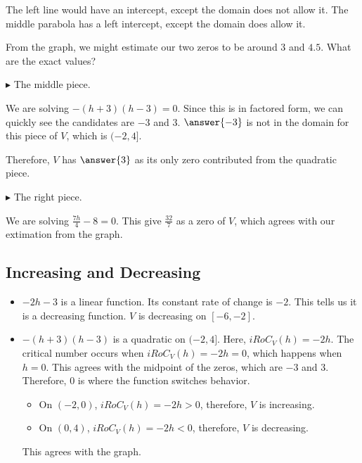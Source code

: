 \documentclass{ximera}
\begin{document}
The left line would have an intercept, except the domain does not allow it.  The middle parabola has a left intercept, except the domain does allow it. 

From the graph, we might estimate our two zeros to be around $3$ and $4.5$.  What are the exact values?







$\blacktriangleright$ The middle piece. 


\begin{explanation}


We are solving $-(h+3)(h-3) = 0$.  Since this is in factored form, we can quickly see the candidates are $-3$ and $3$.  $\answer{-3}$ is not in the domain for this piece of $V$, which is $(-2, 4]$.

Therefore, $V$ has $\answer{3}$ as its only zero contributed from the quadratic piece.
\end{explanation}



$\blacktriangleright$ The right piece. 


\begin{explanation}


We are solving $\frac{7h}{4} - 8 = 0$.  This give $\frac{32}{7}$ as a zero of $V$, which agrees with our extimation from the graph.

\end{explanation}







\subsection{Increasing and Decreasing} 



\begin{itemize}
\item \textbf{$-2h-3$} is a linear function.  Its constant rate of change is $-2$.  This tells us it is a decreasing function.  $V$ is decreasing on $[-6, -2]$.

\item \textbf{$-(h+3)(h-3)$} is a quadratic on $(-2, 4]$. Here, $iRoC_V(h) = -2h$. The critical number occurs when $iRoC_V(h) = -2h = 0$, which happens when $h=0$. This agrees with the midpoint of the zeros, which are $-3$ and $3$.  Therefore, $0$ is where the function switches behavior.  

\begin{itemize}
\item On $(-2, 0)$, $iRoC_V(h) = -2h > 0$, therefore, $V$ is increasing.  
\item On $(0,4)$, $iRoC_V(h) = -2h < 0$, therefore, $V$ is decreasing.
\end{itemize}

This agrees with the graph.

\end{itemize}
\end{document}

